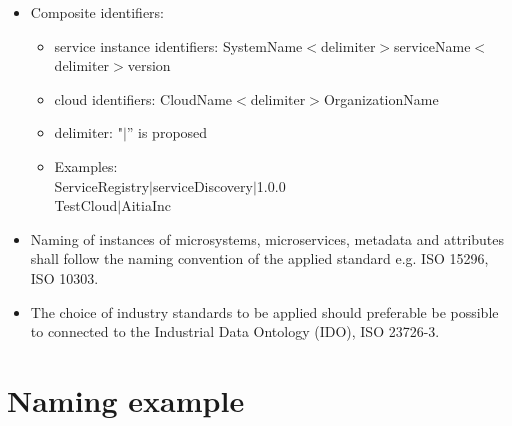 \documentclass[a4paper]{arrowhead}
\begin{document}
\begin{itemize}
\item Composite identifiers:
  \begin{itemize}
      \item  service instance identifiers: SystemName$<$delimiter$>$serviceName$<$delimiter$>$version 
  \end{itemize}

  \begin{itemize}
      \item cloud identifiers: CloudName$<$delimiter$>$OrganizationName
  \end{itemize}

  \begin{itemize}
      \item delimiter: "$|$”  is proposed
  \end{itemize}
  
   \begin{itemize}
    \item Examples: \\
      ServiceRegistry$|$serviceDiscovery$|$1.0.0 \\
      TestCloud$|$AitiaInc
     \end{itemize}
  
\item Naming of instances of microsystems, microservices, metadata and
  attributes shall follow  the naming convention of the
  applied standard e.g. ISO 15296, ISO 10303.
  
\item The choice of industry standards to be applied should preferable
  be possible to connected to the Industrial Data Ontology (IDO), ISO 23726-3.


\end{itemize}


\section{Naming example}
\label{sec:examples}
\end{document}
